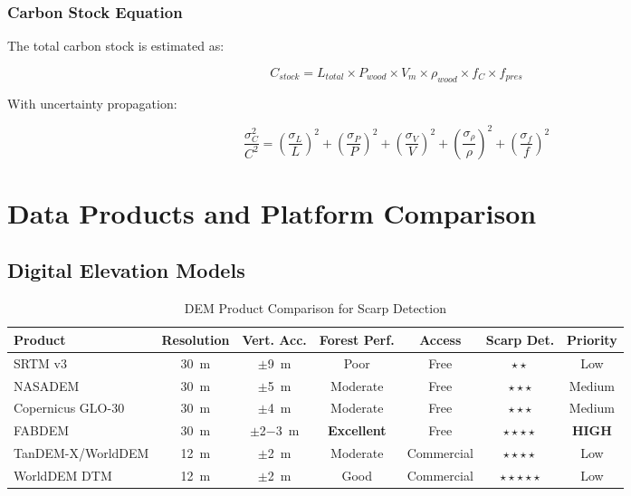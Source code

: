 \documentclass[11pt,letterpaper]{article}
\begin{document}
\subsubsection{Carbon Stock Equation}

The total carbon stock is estimated as:

\begin{equation}
\label{eq:carbon_stock}
C_{stock} = L_{total} \times P_{wood} \times V_m \times \rho_{wood} \times f_C \times f_{pres}
\end{equation}

With uncertainty propagation:

\begin{equation}
\label{eq:uncertainty}
\frac{\sigma_C^2}{C^2} = \left(\frac{\sigma_L}{L}\right)^2 + \left(\frac{\sigma_P}{P}\right)^2 + \left(\frac{\sigma_V}{V}\right)^2 + \left(\frac{\sigma_\rho}{\rho}\right)^2 + \left(\frac{\sigma_f}{f}\right)^2
\end{equation}

\section{Data Products and Platform Comparison}
\label{sec:platforms}

\subsection{Digital Elevation Models}

\begin{table}[h]
\centering
\caption{DEM Product Comparison for Scarp Detection}
\label{tab:dem_comparison}
\small
\begin{tabular}{p{2.5cm}cccccc}
\toprule
\textbf{Product} & \textbf{Resolution} & \textbf{Vert. Acc.} & \textbf{Forest Perf.} & \textbf{Access} & \textbf{Scarp Det.} & \textbf{Priority} \\
\midrule
SRTM v3 & \SI{30}{m} & $\pm$\SI{9}{m} & Poor & Free & $\star\star$ & Low \\
NASADEM & \SI{30}{m} & $\pm$\SI{5}{m} & Moderate & Free & $\star\star\star$ & Medium \\
Copernicus GLO-30 & \SI{30}{m} & $\pm$\SI{4}{m} & Moderate & Free & $\star\star\star$ & Medium \\
\rowcolor{complete!30}
FABDEM & \SI{30}{m} & $\pm$\SI{2-3}{m} & \textbf{Excellent} & Free & $\star\star\star\star$ & \textbf{HIGH} \\
TanDEM-X/WorldDEM & \SI{12}{m} & $\pm$\SI{2}{m} & Moderate & Commercial & $\star\star\star\star$ & Low \\
WorldDEM DTM & \SI{12}{m} & $\pm$\SI{2}{m} & Good & Commercial & $\star\star\star\star\star$ & Low \\
\bottomrule
\end{tabular}
\end{table}
\end{document}
